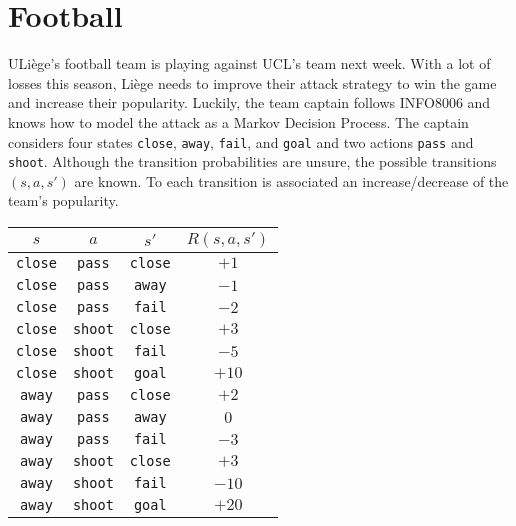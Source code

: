 \documentclass[11pt, a4paper]{article}
\begin{document}
\begin{enumerate}
\begin{solution}
    \end{solution}
\end{enumerate}

\newpage

\section{Football}

ULiège's football team is playing against UCL's team next week. With a lot of losses this season, Liège needs to improve their attack strategy to win the game and increase their popularity. Luckily, the team captain follows INFO8006 and knows how to model the attack as a Markov Decision Process. The captain considers four states \texttt{close}, \texttt{away}, \texttt{fail}, and \texttt{goal} and two actions \texttt{pass} and \texttt{shoot}. Although the transition probabilities are unsure, the possible transitions $(s, a, s')$ are known. To each transition is associated an increase/decrease of the team's popularity.

\begin{table}[h]
    \centering
    \begin{tabular}{ccc|c}
        \toprule
         $s$ & $a$ & $s'$ & $R(s, a, s')$ \\
         \midrule
         \texttt{close} & \texttt{pass} & \texttt{close} & $+1$ \\
         \texttt{close} & \texttt{pass} & \texttt{away} & $-1$ \\
         \texttt{close} & \texttt{pass} & \texttt{fail} & $-2$ \\
         \texttt{close} & \texttt{shoot} & \texttt{close} & $+3$ \\
         \texttt{close} & \texttt{shoot} & \texttt{fail} & $-5$ \\
         \texttt{close} & \texttt{shoot} & \texttt{goal} & $+10$ \\
         \midrule
         \texttt{away} & \texttt{pass} & \texttt{close} & $+2$ \\
         \texttt{away} & \texttt{pass} & \texttt{away} & $0$ \\
         \texttt{away} & \texttt{pass} & \texttt{fail} & $-3$ \\
         \texttt{away} & \texttt{shoot} & \texttt{close} & $+3$ \\
         \texttt{away} & \texttt{shoot} & \texttt{fail} & $-10$ \\
         \texttt{away} & \texttt{shoot} & \texttt{goal} & $+20$ \\
         \bottomrule
    \end{tabular}
\end{table}
\end{document}
